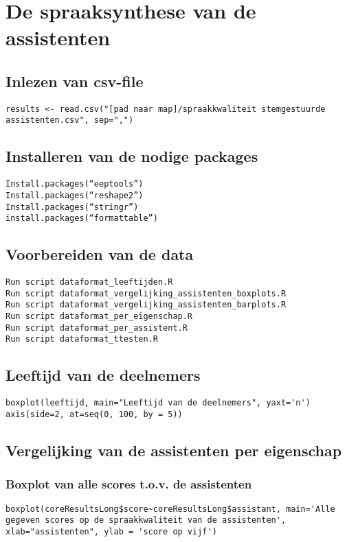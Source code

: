 \section{De spraaksynthese van de assistenten}
\subsection{Inlezen van csv-file}
\begin{lstlisting}
results <- read.csv("[pad naar map]/spraakkwaliteit stemgestuurde assistenten.csv", sep=",")
\end{lstlisting}

\subsection{Installeren van de nodige packages}
\begin{lstlisting}
Install.packages(“eeptools”)
Install.packages(“reshape2”)
Install.packages(“stringr”)
install.packages(“formattable”)
\end{lstlisting}

\subsection{Voorbereiden van de data}
\begin{lstlisting}
Run script dataformat_leeftijden.R
Run script dataformat_vergelijking_assistenten_boxplots.R
Run script dataformat_vergelijking_assistenten_barplots.R
Run script dataformat_per_eigenschap.R
Run script dataformat_per_assistent.R
Run script dataformat_ttesten.R
\end{lstlisting}

\subsection{Leeftijd van de deelnemers}
\begin{lstlisting}
boxplot(leeftijd, main="Leeftijd van de deelnemers", yaxt='n')
axis(side=2, at=seq(0, 100, by = 5))
\end{lstlisting}

\subsection{Vergelijking van de assistenten per eigenschap}
\subsubsection{Boxplot van alle scores t.o.v. de assistenten}
\begin{lstlisting}
boxplot(coreResultsLong$score~coreResultsLong$assistant, main='Alle gegeven scores op de spraakkwaliteit van de assistenten', xlab="assistenten", ylab = 'score op vijf')
\end{lstlisting}

